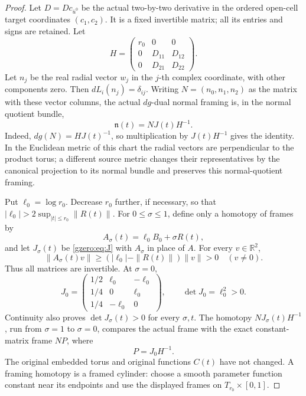 \documentclass[11pt]{article}
\theoremstyle{definition}
\newcommand{\R}{\mathbb R}
\begin{document}
\begin{proof}
Let \(D=Dc_{\overline u^0}\) be the actual two-by-two derivative in
the ordered open-cell target coordinates \((c_1,c_2)\). It is a fixed
invertible matrix; all its entries and signs are retained. Let
\[
 H=\begin{pmatrix}r_0&0&0\\0&D_{11}&D_{12}\\0&D_{21}&D_{22}\end{pmatrix}.
\]
Let \(n_j\) be the real radial vector \(w_j\) in the \(j\)-th complex
coordinate, with other components zero. Then \(dL_i(n_j)=\delta_{ij}\).
Writing \(N=(n_0,n_1,n_2)\) as the matrix with these vector columns, the actual
\(dg\)-dual normal framing is, in the normal quotient bundle,
\begin{equation}
 \mathfrak n(t)=N J(t)H^{-1}.
 \label{gzero:eq:actual-frame}
\end{equation}
Indeed, \(dg(N)=HJ(t)^{-1}\), so multiplication by \(J(t)H^{-1}\)
gives the identity. In the Euclidean metric of this chart the radial
vectors are perpendicular to the product torus; a different source
metric changes their representatives by the canonical projection to its
normal bundle and preserves this normal-quotient framing.

Put \(\ell_0=\log r_0\). Decrease \(r_0\) further, if necessary, so
that \(|\ell_0|>2\sup_{|t|\leq r_0}\|R(t)\|\). For
\(0\leq\sigma\leq1\), define only a homotopy of frames by
\[
 A_\sigma(t)=\ell_0B_0+\sigma R(t),
\]
and let \(J_\sigma(t)\) be \eqref{gzero:eq:J} with \(A_\sigma\) in place
of \(A\). For every \(v\in\R^2\),
\[
 \|A_\sigma(t)v\|\geq
 (|\ell_0|-\|R(t)\|)\|v\|>0\quad(v\ne0).
\]
Thus all matrices are invertible. At \(\sigma=0\),
\begin{equation}
 J_0=
 \begin{pmatrix}
 1/2&\ell_0&-\ell_0\\
 1/4&0&\ell_0\\
 1/4&-\ell_0&0
 \end{pmatrix},\qquad \det J_0=\ell_0^2>0.
 \label{gzero:eq:J0}
\end{equation}
Continuity also proves \(\det J_\sigma(t)>0\) for every \(\sigma,t\).
The homotopy \(N J_\sigma(t)H^{-1}\), run from \(\sigma=1\) to
\(\sigma=0\), compares the actual frame with the exact constant-matrix
frame \(N P\), where
\begin{equation}
 P=J_0H^{-1}.
 \label{gzero:eq:P}
\end{equation}
The original embedded torus and original functions \(C(t)\) have not
changed. A framing homotopy is a framed cylinder: choose a smooth
parameter function constant near its endpoints and use the displayed
frames on \(T_{r_0}\times[0,1]\).


\end{proof}
\end{document}
